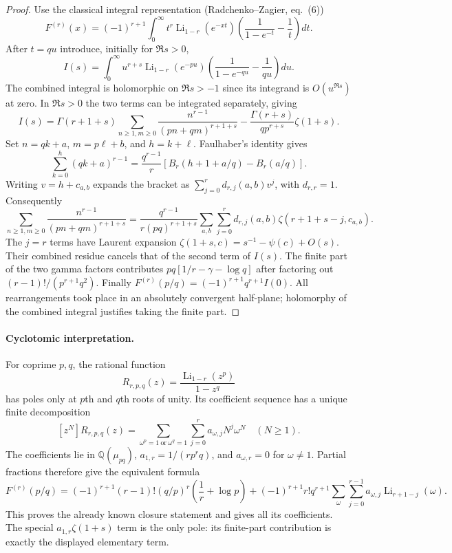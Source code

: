 \begin{proof}
Use the classical integral representation (Radchenko--Zagier, eq.~(6))
\[
 F^{(r)}(x)=(-1)^{r+1}
 \int_0^\infty t^r\operatorname{Li}_{1-r}(e^{-xt})
 \left(\frac1{1-e^{-t}}-\frac1t\right)dt.
\]
After $t=qu$ introduce, initially for $\Re s>0$,
\[
 I(s)=\int_0^\infty u^{r+s}\operatorname{Li}_{1-r}(e^{-pu})
 \left(\frac1{1-e^{-qu}}-\frac1{qu}\right)du.
\]
The combined integral is holomorphic on $\Re s>-1$ since its integrand is
$O(u^{\Re s})$ at zero. In $\Re s>0$ the two terms can be integrated
separately, giving
\[
 I(s)=\Gamma(r+1+s)
 \sum_{n\ge1,m\ge0}\frac{n^{r-1}}{(pn+qm)^{r+1+s}}
 -\frac{\Gamma(r+s)}{qp^{r+s}}\zeta(1+s).
\]
Set $n=qk+a$, $m=p\ell+b$, and $h=k+\ell$. Faulhaber's identity gives
\[
 \sum_{k=0}^h(qk+a)^{r-1}
 =\frac{q^{r-1}}r
 \left[B_r(h+1+a/q)-B_r(a/q)\right].
\]
Writing $v=h+c_{a,b}$ expands the bracket as
$\sum_{j=0}^r d_{r,j}(a,b)v^j$, with $d_{r,r}=1$.
Consequently
\[
 \sum_{n\ge1,m\ge0}\frac{n^{r-1}}{(pn+qm)^{r+1+s}}
 =\frac{q^{r-1}}{r(pq)^{r+1+s}}
 \sum_{a,b}\sum_{j=0}^r d_{r,j}(a,b)
 \zeta(r+1+s-j,c_{a,b}).
\]
The $j=r$ terms have Laurent expansion
$\zeta(1+s,c)=s^{-1}-\psi(c)+O(s)$.
Their combined residue cancels that of the second term of $I(s)$.
The finite part of the two gamma factors contributes
$pq[1/r-\gamma-\log q]$ after factoring out
$(r-1)!/(p^{r+1}q^2)$. Finally
$F^{(r)}(p/q)=(-1)^{r+1}q^{r+1}I(0)$.
All rearrangements took place in an absolutely convergent half-plane;
holomorphy of the combined integral justifies taking the finite part.
\end{proof}

\paragraph{Cyclotomic interpretation.}
For coprime $p,q$, the rational function
\[
 R_{r,p,q}(z)=\frac{\operatorname{Li}_{1-r}(z^p)}{1-z^q}
\]
has poles only at $p$th and $q$th roots of unity. Its coefficient sequence
has a unique finite decomposition
\[
 [z^N]R_{r,p,q}(z)=
 \sum_{\omega^p=1\ \text{or}\ \omega^q=1}
 \sum_{j=0}^{r}a_{\omega,j}N^j\omega^N\quad(N\ge1).
\]
The coefficients lie in $\mathbb Q(\mu_{pq})$,
$a_{1,r}=1/(rp^rq)$, and $a_{\omega,r}=0$ for $\omega\ne1$.
Partial fractions therefore give the equivalent formula
\[
 F^{(r)}(p/q)=(-1)^{r+1}(r-1)!(q/p)^r
 \left(\frac1r+\log p\right)
 +(-1)^{r+1}r!q^{r+1}
 \sum_{\omega}\sum_{j=0}^{r-1}
 a_{\omega,j}\operatorname{Li}_{r+1-j}(\omega).
\]
This proves the already known closure statement and gives all its
coefficients. The special $a_{1,r}\zeta(1+s)$ term is the only pole:
its finite-part contribution is exactly the displayed elementary term.

